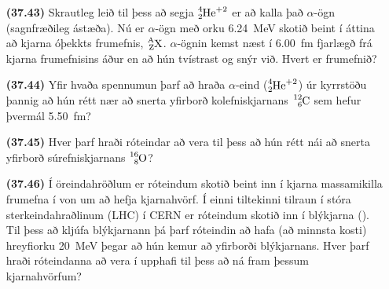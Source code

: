 \begin{enumerate}[label = \textbf{(\alph*)}]

\item[\textbf{(37.43)}] Skrautleg leið til þess að segja $\ce{^{4}_{2}He^{+2}}$ er að kalla það $\alpha$-ögn (sagnfræðileg ástæða). Nú er $\alpha$-ögn með orku \SI{6.24}{MeV} skotið beint í áttina að kjarna óþekkts frumefnis, $\ce{^{A}_{Z}X}$. $\alpha$-ögnin kemst næst í \SI{6.00}{fm} fjarlægð frá kjarna frumefnisins áður en að hún tvístrast og snýr við. Hvert er frumefnið?

\item[\textbf{(37.44)}] Yfir hvaða spennumun þarf að hraða $\alpha$-eind ($\ce{^{4}_{2}He^{+2}}$) úr kyrrstöðu þannig að hún rétt nær að snerta yfirborð kolefniskjarnans $\ce{^{12}_{6}C}$ sem hefur þvermál \SI{5.50}{fm}?

\item[\textbf{(37.45)}] Hver þarf hraði róteindar að vera til þess að hún rétt nái að snerta yfirborð súrefniskjarnans $\ce{^{16}_{8}O}$?

\item[\textbf{(37.46)}] Í öreindahröðlum er róteindum skotið beint inn í kjarna massamikilla frumefna í von um að hefja kjarnahvörf. Í einni tiltekinni tilraun í stóra sterkeindahraðlinum (LHC) í CERN er róteindum skotið inn í blýkjarna (). Til þess að kljúfa blýkjarnann þá þarf róteindin að hafa (að minnsta kosti) hreyfiorku \SI{20}{MeV} þegar að hún kemur að yfirborði blýkjarnans. Hver þarf hraði róteindanna að vera í upphafi til þess að ná fram þessum kjarnahvörfum?

\end{enumerate}


